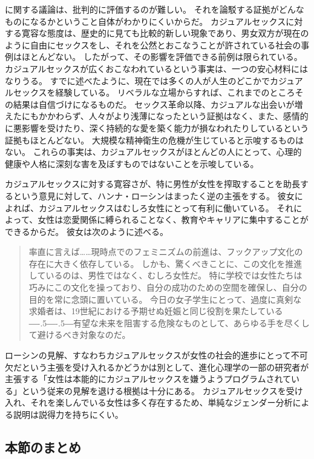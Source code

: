 \documentclass[paper=a4,book,openany]{jlreq}
\def\DDASH{―\kern-.5\zw―\kern-.5\zw―} %
\begin{document}
に関する議論は、批判的に評価するのが難しい。
それを論駁する証拠がどんなものになるかということ自体がわかりにくいからだ。
カジュアルセックスに対する寛容な態度は、歴史的に見ても比較的新しい現象であり、男女双方が現在のように自由にセックスをし、それを公然とおこなうことが許されている社会の事例はほとんどない。
したがって、その影響を評価できる前例は限られている。
カジュアルセックスが広くおこなわれているという事実は、一つの安心材料にはなりうる。
すでに述べたように、現在では多くの人が人生のどこかでカジュアルセックスを経験している。
リベラルな立場からすれば、これまでのところその結果は自信づけになるものだ。
セックス革命以降、カジュアルな出会いが増えたにもかかわらず、人々がより浅薄になったという証拠はなく、また、感情的に悪影響を受けたり、深く持続的な愛を築く能力が損なわれたりしているという証拠もほとんどない。
大規模な精神衛生の危機が生じていると示唆するものはない。
これらの事実は、カジュアルセックスがほとんどの人にとって、心理的健康や人格に深刻な害を及ぼすものではないことを示唆している。

カジュアルセックスに対する寛容さが、特に男性が女性を搾取することを助長するという意見に対して、ハンナ・ローシンはまったく逆の主張をする。
彼女によれば、カジュアルセックスはむしろ女性にとって有利に働いている。
それによって、女性は恋愛関係に縛られることなく、教育やキャリアに集中することができるからだ。
彼女は次のように述べる。

\begin{quote}
  率直に言えば……現時点でのフェミニズムの前進は、フックアップ文化の存在に大きく依存している。
しかも、驚くべきことに、この文化を推進しているのは、男性ではなく、むしろ女性だ。
特に学校では女性たちは巧みにこの文化を操っており、自分の成功のための空間を確保し、自分の目的を常に念頭に置いている。
今日の女子学生にとって、過度に真剣な求婚者は、19世紀における予期せぬ妊娠と同じ役割を果たしている{\DDASH}有望な未来を阻害する危険なものとして、あらゆる手を尽くして避けるべき対象なのだ。
\citep{rosin12:_boys_side}
\end{quote}

ローシンの見解、すなわちカジュアルセックスが女性の社会的進歩にとって不可欠だという主張を受け入れるかどうかは別として、進化心理学の一部の研究者が主張する「女性は本能的にカジュアルセックスを嫌うようプログラムされている」という従来の見解を退ける根拠は十分にある。
カジュアルセックスを受け入れ、それを楽しんでいる女性は多く存在するため、単純なジェンダー分析による説明は説得力を持ちにくい。

\subsection{本節のまとめ}
\end{document}
